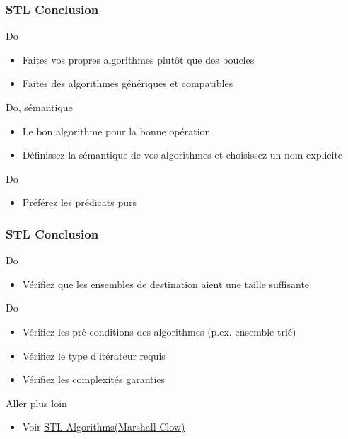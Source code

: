 \documentclass[C++.tex]{subfiles}
\begin{document}
\begin{frame}[fragile]
	\frametitle{STL Conclusion}
	\begin{exampleblock}{Do}
		\begin{itemize}
			\item Faites vos propres algorithmes plutôt que des boucles
			\item Faites des algorithmes génériques et compatibles
		\end{itemize}
	\end{exampleblock}

	\begin{exampleblock}{Do, sémantique}
		\begin{itemize}
			\item Le bon algorithme pour la bonne opération
			\item Définissez la sémantique de vos algorithmes et choisissez un nom explicite
		\end{itemize}
	\end{exampleblock}

	\begin{exampleblock}{Do}
		\begin{itemize}
			\item Préférez les prédicats purs
		\end{itemize}
	\end{exampleblock}
\end{frame}

\begin{frame}[fragile]
	\frametitle{STL Conclusion}
	\begin{exampleblock}{Do}
		\begin{itemize}
			\item Vérifiez que les ensembles de destination aient une taille suffisante
		\end{itemize}
	\end{exampleblock}

	\begin{exampleblock}{Do}
		\begin{itemize}
			\item Vérifiez les pré-conditions des algorithmes (p.ex. ensemble trié)
			\item Vérifiez le type d'itérateur requis
			\item Vérifiez les complexités garanties
		\end{itemize}
	\end{exampleblock}

	\begin{block}{Aller plus loin}
		\begin{itemize}
			\item Voir \href{https://github.com/CppCon/CppCon2016/blob/master/Presentations/STL\%20Algorithms/STL\%20Algorithms\%20-\%20Marshall\%20Clow\%20-\%20CppCon\%202016.pdf}{STL Algorithms\linklogo (Marshall Clow)}
		\end{itemize}

	\end{block}
\end{frame}
\end{document}
